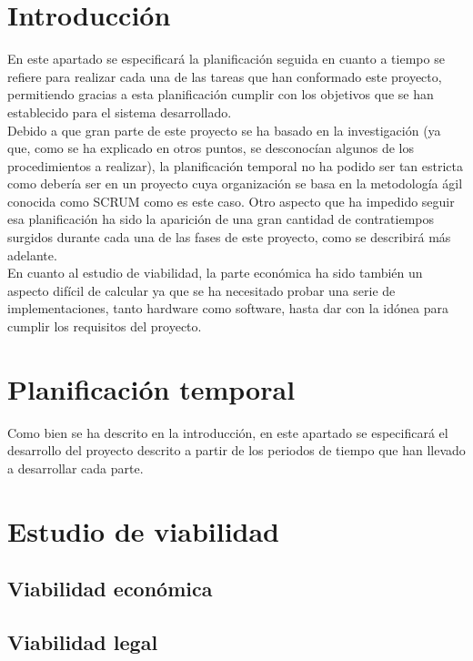 
\section{Introducción}
En este apartado se especificará la planificación seguida en cuanto a tiempo se refiere para realizar cada una de las tareas que han conformado este proyecto, permitiendo gracias a esta planificación cumplir con los objetivos que se han establecido para el sistema desarrollado.\\
Debido a que gran parte de este proyecto se ha basado en la investigación (ya que, como se ha explicado en otros puntos, se desconocían algunos de los procedimientos a realizar), la planificación temporal no ha podido ser tan estricta como debería ser en un proyecto cuya organización se basa en la metodología ágil conocida como SCRUM como es este caso. Otro aspecto que ha impedido seguir esa planificación ha sido la aparición de una gran cantidad de contratiempos surgidos durante cada una de las fases de este proyecto, como se describirá más adelante.\\
En cuanto al estudio de viabilidad, la parte económica ha sido también un aspecto difícil de calcular ya que se ha necesitado probar una serie de implementaciones, tanto hardware como software, hasta dar con la idónea para cumplir los requisitos del proyecto.
 
\section{Planificación temporal}
Como bien se ha descrito en la introducción, en este apartado se especificará el desarrollo del proyecto descrito a partir de los periodos de tiempo que han llevado a desarrollar cada parte.
\section{Estudio de viabilidad}

\subsection{Viabilidad económica}

\subsection{Viabilidad legal}


